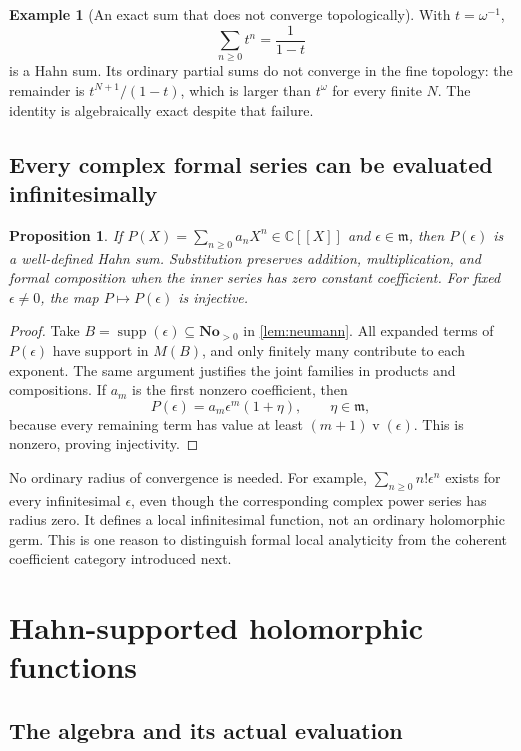 \documentclass[11pt,letterpaper]{article}
\numberwithin{equation}{section}
\newtheorem{proposition}[theorem]{Proposition}
\theoremstyle{definition}
\newtheorem{example}[theorem]{Example}
\theoremstyle{remark}
\newcommand{\No}{\mathbf{No}}
\newcommand{\C}{\mathbb{C}}
\newcommand{\mm}{\mathfrak{m}}
\newcommand{\supp}{\operatorname{supp}}
\newcommand{\val}{\operatorname{v}}
\begin{document}
\begin{example}[An exact sum that does not converge topologically]
With $t=\omega^{-1}$,
\[
 \sum_{n\ge0}t^n=\frac1{1-t}
\]
is a Hahn sum. Its ordinary partial sums do not converge in the fine topology:
the remainder is $t^{N+1}/(1-t)$, which is larger than $t^\omega$ for every
finite $N$. The identity is algebraically exact despite that failure.
\end{example}

\subsection{Every complex formal series can be evaluated infinitesimally}

\begin{proposition}\label{prop:formal}
If $P(X)=\sum_{n\ge0}a_nX^n\in\C[[X]]$ and $\epsilon\in\mm$, then
$P(\epsilon)$ is a well-defined Hahn sum. Substitution preserves addition,
multiplication, and formal composition when the inner series has zero
constant coefficient. For fixed $\epsilon\ne0$, the map
$P\mapsto P(\epsilon)$ is injective.
\end{proposition}
\begin{proof}
Take $B=\supp(\epsilon)\subseteq\No_{>0}$ in \cref{lem:neumann}.
All expanded terms of $P(\epsilon)$ have support in $M(B)$, and only finitely
many contribute to each exponent. The same argument justifies the joint
families in products and compositions. If $a_m$ is the first nonzero
coefficient, then
\[
 P(\epsilon)=a_m\epsilon^m(1+\eta),\qquad \eta\in\mm,
\]
because every remaining term has value at least $(m+1)\val(\epsilon)$.
This is nonzero, proving injectivity.
\end{proof}

No ordinary radius of convergence is needed. For example,
$\sum_{n\ge0}n!\epsilon^n$ exists for every infinitesimal $\epsilon$, even
though the corresponding complex power series has radius zero. It defines a
local infinitesimal function, not an ordinary holomorphic germ. This is one
reason to distinguish formal local analyticity from the coherent coefficient
category introduced next.

\section{Hahn-supported holomorphic functions}\label{sec:category}

\subsection{The algebra and its actual evaluation}
\end{document}
